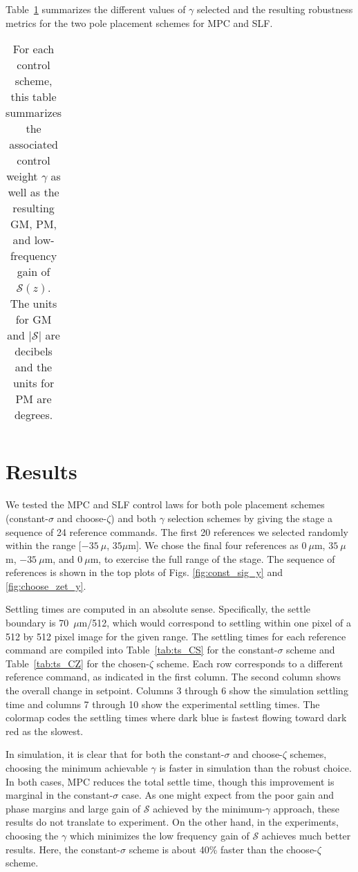 \documentclass[twocolumn,twoside]{IEEEtran}
\begin{document}
Table~\ref{tab:gmpms} summarizes the different values of $\gamma$ selected and the resulting robustness metrics for the two pole placement schemes for MPC and SLF.

\begin{table}[httb!]
  \caption{For each control scheme, this table summarizes the associated control weight $\gamma$ as well as the resulting GM, PM, and low-frequency gain of $\mathcal{S}(z)$. The units for GM and $|\mathcal{S}|$ are decibels and the units for PM are degrees.}
  \label{tab:gmpms}
  \scriptsize
  \begin{tabular}{cccccc}
    
  \end{tabular}
\end{table}


\section{Results}\label{sec:results}

We tested the MPC and SLF control laws for both pole placement schemes (constant-$\sigma$ and choose-$\zeta$) and both $\gamma$ selection schemes by giving the stage a sequence of 24 reference commands. The first 20 references we selected randomly within the range $[-35~\mu$, $35\mu\text{m}]$. We chose the final four references as $0~\mu$m, $35~\mu$m, $-35~\mu$m, and $0~\mu$m, to exercise the full range of the stage. The sequence of references is shown in the top plots of Figs. \ref{fig:const_sig_y} and \ref{fig:choose_zet_y}.

Settling times are computed in an absolute sense. Specifically, the settle boundary is 70~$\mu$m/512, which would correspond to settling within one pixel of a 512 by 512 pixel image for the given range.
The settling times for each reference command are compiled into Table~\ref{tab:ts_CS} for the constant-$\sigma$ scheme and Table~\ref{tab:ts_CZ} for the chosen-$\zeta$ scheme. Each row corresponds to a different reference command, as indicated in the first column. The second column shows the overall change in setpoint. Columns 3 through 6 show the simulation settling time and columns 7 through 10 show the experimental settling times. The colormap codes the settling times where dark blue is fastest flowing toward dark red as the slowest. 

In simulation, it is clear that for both the constant-$\sigma$ and choose-$\zeta$ schemes, choosing the minimum achievable $\gamma$ is faster in simulation than the robust choice. In both cases, MPC reduces the total settle time, though this improvement is marginal in the constant-$\sigma$ case. As one might expect from the poor gain and phase margins and large gain of $\mathcal{S}$ achieved by the minimum-$\gamma$ approach, these results do not translate to experiment.
On the other hand, in the experiments, choosing the $\gamma$ which minimizes the low frequency gain of $\mathcal{S}$ achieves much better results. Here, the constant-$\sigma$ scheme is about 40\% faster than the choose-$\zeta$ scheme.
\end{document}
